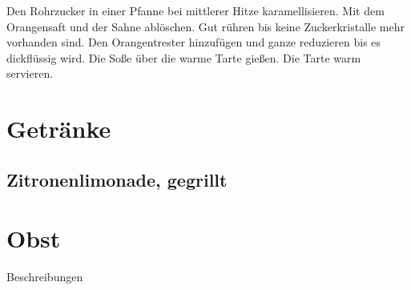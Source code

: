 Den Rohrzucker in einer Pfanne bei mittlerer Hitze karamellisieren. Mit dem 
Orangensaft und der Sahne ablöschen. Gut rühren bis keine Zuckerkristalle 
mehr vorhanden sind.
Den Orangentrester hinzufügen und ganze reduzieren bis es dickflüssig wird. 
Die Soße über die warme Tarte gießen. Die Tarte warm servieren.

\section{Getränke}

\subsection{Zitronenlimonade, gegrillt}

\section{Obst}

\begin{description}
	\item [Beschreibungen]
\end{description}
